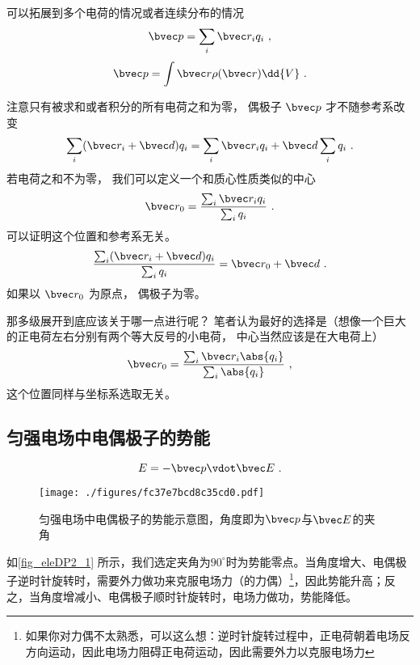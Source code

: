 

可以拓展到多个电荷的情况或者连续分布的情况
\begin{equation}
\bvec p = \sum_i \bvec r_i q_i~,
\end{equation}
\begin{equation}
\bvec p = \int \bvec r \rho(\bvec r) \dd{V}~.
\end{equation}

注意只有被求和或者积分的所有电荷之和为零， 偶极子 $\bvec p$ 才不随参考系改变
\begin{equation}
\sum_i (\bvec r_i + \bvec d) q_i = \sum_i \bvec r_i q_i + \bvec d \sum_i q_i~.
\end{equation}
若电荷之和不为零， 我们可以定义一个和质心性质类似的中心
\begin{equation}
\bvec r_0 = \frac{\sum_i \bvec r_i q_i}{\sum_i q_i}~.
\end{equation}
可以证明这个位置和参考系无关。
\begin{equation}
\frac{\sum_i (\bvec r_i + \bvec d) q_i}{\sum_i q_i} = \bvec r_0 + \bvec d~.
\end{equation}
如果以 $\bvec r_0$ 为原点， 偶极子为零。

那多级展开到底应该关于哪一点进行呢？ 笔者认为最好的选择是（想像一个巨大的正电荷左右分别有两个等大反号的小电荷， 中心当然应该是在大电荷上）
\begin{equation}
\bvec r_0 = \frac{\sum_i \bvec r_i \abs{q_i}}{\sum_i \abs{q_i}}~,
\end{equation}
这个位置同样与坐标系选取无关。

\subsection{匀强电场中电偶极子的势能}
\begin{equation}\label{eq_eleDP2_1}
E = -\bvec p \vdot \bvec E~.
\end{equation}
\begin{figure}[ht]
\centering
\texttt{[image: ./figures/fc37e7bcd8c35cd0.pdf]}
\caption{匀强电场中电偶极子的势能示意图，角度即为$\bvec p$与$\bvec E$的夹角} \label{fig_eleDP2_1}
\end{figure}
如\autoref{fig_eleDP2_1} 所示，我们选定夹角为$90^\circ$时为势能零点。当角度增大、电偶极子逆时针旋转时，需要外力做功来克服电场力（的力偶）\footnote{如果你对力偶不太熟悉，可以这么想：逆时针旋转过程中，正电荷朝着电场反方向运动，因此电场力阻碍正电荷运动，因此需要外力以克服电场力}，因此势能升高；反之，当角度增减小、电偶极子顺时针旋转时，电场力做功，势能降低。
